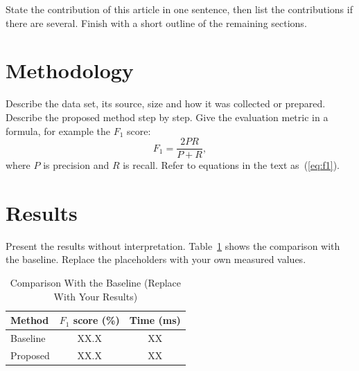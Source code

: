 \documentclass[journal]{IEEEtran}
\begin{document}
State the contribution of this article in one sentence, then list the contributions if there are several. Finish with a short outline of the remaining sections.

\section{Methodology}
Describe the data set, its source, size and how it was collected or prepared. Describe the proposed method step by step. Give the evaluation metric in a formula, for example the $F_1$ score:
\begin{equation}
  F_1 = \frac{2PR}{P+R},
  \label{eq:f1}
\end{equation}
where $P$ is precision and $R$ is recall. Refer to equations in the text as~(\ref{eq:f1}).

\section{Results}
Present the results without interpretation. Table~\ref{tab:results} shows the comparison with the baseline. Replace the placeholders with your own measured values.

\begin{table}[!t]
  \caption{Comparison With the Baseline (Replace With Your Results)}
  \label{tab:results}
  \centering
  \begin{tabular}{lcc}
    \toprule
    Method & $F_1$ score (\%) & Time (ms) \\
    \midrule
    Baseline & XX.X & XX \\
    Proposed & XX.X & XX \\
    \bottomrule
  \end{tabular}
\end{table}

\end{document}
